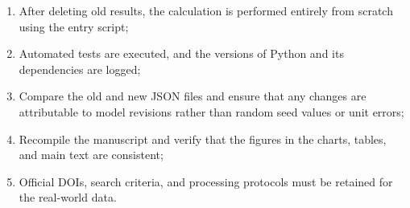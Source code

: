 \documentclass[11pt,a4paper,openany]{book}
\numberwithin{equation}{chapter}
\numberwithin{figure}{chapter}
\numberwithin{table}{chapter}
\begin{document}
\begin{enumerate}[leftmargin=1.6em,itemsep=3pt]
\item






After deleting old results, the calculation is performed entirely from scratch using the entry script;









\item






Automated tests are executed, and the versions of Python and its dependencies are logged;









\item






Compare the old and new JSON files and ensure that any changes are attributable to model revisions rather than random seed values ​​or unit errors;









\item






Recompile the manuscript and verify that the figures in the charts, tables, and main text are consistent;









\item






Official DOIs, search criteria, and processing protocols must be retained for the real-world data.









\end{enumerate}
\end{document}
